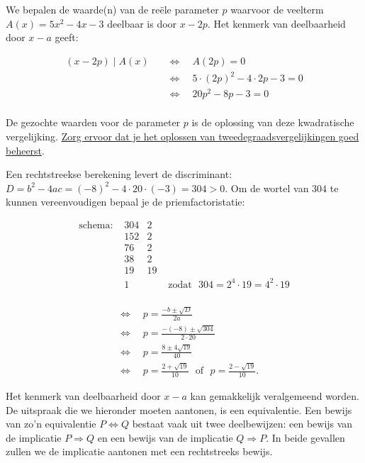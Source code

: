 \documentclass{ximera}
\begin{document}
\begin{example} 
We bepalen de waarde(n) van de reële parameter $p$ waarvoor de veelterm $A(x) = 5x^2-4x-3$ deelbaar is door $x-2p$. Het kenmerk van deelbaarheid door $x-a$ geeft:

\begin{align*}
(x-2p) \mid A(x) \quad 
& \Leftrightarrow \quad A(2p) = 0 \\
& \Leftrightarrow \quad 5 \cdot (2p)^2 - 4 \cdot 2p - 3 = 0 \\
& \Leftrightarrow \quad 20p^2 - 8p - 3 = 0 \\
\end{align*}

De gezochte waarden voor de parameter \(p \) is de oplossing van deze kwadratische vergelijking. \href{https://wiskunde.opmaat.org/rekenoffensief/vaardigheden/tweede_graad/kwadratische_vergelijkingen}{Zorg ervoor dat je het oplossen van tweedegraadsvergelijkingen goed beheerst}. 


Een rechtstreekse berekening levert de discriminant: \(D = b^2-4ac = (-8)^2-4 \cdot 20 \cdot (-3) = 304 > 0 \). Om de wortel van \(304\) te kunnen vereenvoudigen bepaal je de priemfactoristatie: 

\[
\begin{array}{lc|cr}
\text{schema: } & 304 & 2 \\
& 152 & 2 \\
& 76 & 2 \\
& 38 & 2 \\
& 19 & 19 \\
& 1 & & \text{ zodat } \,\, 304 = 2^4 \cdot 19 = 4^2 \cdot 19
\end{array}
\]

\begin{align*} \\
& \Leftrightarrow \quad p = \frac{-b \pm \sqrt{D}}{2a} \\ 
& \Leftrightarrow \quad p = \frac{-(-8) \pm \sqrt{304}}{2 \cdot 20} \\ 
& \Leftrightarrow \quad p = \frac{8 \pm 4\sqrt{19}}{40} \\
& \Leftrightarrow \quad p = \frac{2 + \sqrt{19}}{10} \,\, \text{ of } \,\, p = \frac{2 - \sqrt{19}}{10}.
\end{align*}

\end{example} 


Het kenmerk van deelbaarheid door $x-a$ kan gemakkelijk veralgemeend worden. De uitspraak die we hieronder moeten aantonen, is een equivalentie. Een bewijs van zo'n equivalentie $P \Leftrightarrow Q$ bestaat vaak uit twee deelbewijzen: een bewijs van de implicatie $P \Rightarrow Q$ en een bewijs van de implicatie $Q \Rightarrow P$. In beide gevallen zullen we de implicatie aantonen met een rechtstreeks bewijs.
\end{document}

